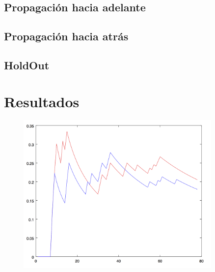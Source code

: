 \documentclass[10pt, a4paper,spanish]{article}
\begin{document}
		\subsection{Propagación hacia adelante}
			\paragraph{}

		\subsection{Propagación hacia atrás}
			\paragraph{}

		\subsection{HoldOut}
			\paragraph{}

	\section{Resultados}

		\begin{figure}[H]
			\begin{center}
				\includegraphics[width=0.9\textwidth]{chart}
			\end{center}
		\end{figure}
\end{document}
